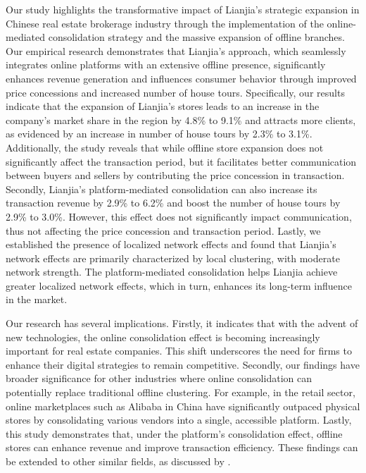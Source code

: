 \documentclass[11pt]{article}
\begin{document}
Our study highlights the transformative impact of Lianjia's strategic expansion in Chinese real estate brokerage industry through the implementation of the online-mediated consolidation strategy and the massive expansion of offline branches. Our empirical research demonstrates that Lianjia's approach, which seamlessly integrates online platforms with an extensive offline presence, significantly enhances revenue generation and influences consumer behavior through improved price concessions and increased number of house tours. Specifically, our results indicate that the expansion of Lianjia's stores leads to an increase in the company's market share in the region by 4.8\% to 9.1\% and attracts more clients, as evidenced by an increase in number of house tours by 2.3\% to 3.1\%. Additionally, the study reveals that while offline store expansion does not significantly affect the transaction period, but it facilitates better communication between buyers and sellers by contributing the price concession in transaction. Secondly, Lianjia's platform-mediated consolidation can also increase its transaction revenue by 2.9\% to 6.2\% and boost the number of house tours by 2.9\% to 3.0\%. However, this effect does not significantly impact communication, thus not affecting the price concession and transaction period. Lastly, we established the presence of localized network effects and found that Lianjia's network effects are primarily characterized by local clustering, with moderate network strength. The platform-mediated consolidation helps Lianjia achieve greater localized network effects, which in turn, enhances its long-term influence in the market.

Our research has several implications. Firstly, it indicates that with the advent of new technologies, the online consolidation effect is becoming increasingly important for real estate companies. This shift underscores the need for firms to enhance their digital strategies to remain competitive. Secondly, our findings have broader significance for other industries where online consolidation can potentially replace traditional offline clustering. For example, in the retail sector, online marketplaces such as Alibaba in China have significantly outpaced physical stores by consolidating various vendors into a single, accessible platform. Lastly, this study demonstrates that, under the platform's consolidation effect, offline stores can enhance revenue and improve transaction efficiency. These findings can be extended to other similar fields, as discussed by \citep{10.1257/jep.28.2.3}.
\end{document}
